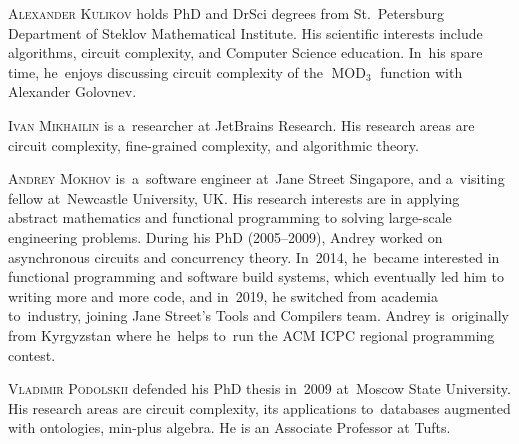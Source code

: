 \documentclass{toc}
\begin{document}
\begin{tocaboutauthors}
\begin{tocabout}[kulikov]
  \textsc{Alexander Kulikov}  %
  holds PhD and DrSci degrees from St.~Petersburg Department of Steklov Mathematical Institute. His scientific interests include algorithms, circuit complexity, and Computer Science education. In~his spare time, he~enjoys discussing circuit complexity of the $\operatorname{MOD}_3$ function with Alexander Golovnev.
\end{tocabout}
\begin{tocabout}[mikhailin]
  \textsc{Ivan Mikhailin}    %
  is a~researcher at JetBrains Research.
  His research areas are circuit complexity,
  fine-grained complexity, and algorithmic theory.
\end{tocabout}
\begin{tocabout}[mokhov]
  \textsc{Andrey Mokhov}    %
  is~a~software engineer at~Jane Street Singapore, and
  a~visiting fellow at~Newcastle University, UK. His research interests are in
  applying abstract mathematics and functional programming to solving large-scale engineering problems. During his PhD (2005--2009), Andrey worked
  on asynchronous circuits and concurrency theory. In~2014, he~became interested in functional programming and software build systems, which
  eventually led him to writing more and more code, and in~2019, he switched from academia to~industry, joining Jane Street's Tools and Compilers
  team. Andrey is~originally from Kyrgyzstan where he~helps to~run the ACM ICPC regional programming contest.
\end{tocabout}
\begin{tocabout}[podolskii]
  \textsc{Vladimir Podolskii}   %
  defended his PhD thesis in~2009 at~Moscow State University. His research areas are circuit complexity, its applications to~databases augmented with ontologies, min-plus algebra. He is an Associate Professor at Tufts.
\end{tocabout}
\end{tocaboutauthors}
\end{document}

